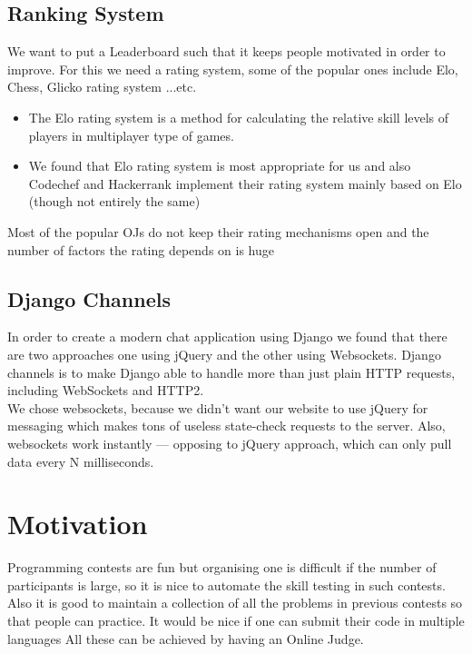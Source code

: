 \documentclass[hidelinks, a4paper,12pt, titlepage]{article}
\begin{document}
\subsection{Ranking System}
We want to put a Leaderboard such that it keeps people motivated in order to improve. For this we need a rating system, some of the popular ones include Elo, Chess, Glicko rating system ...etc.
\begin{itemize}
\item The Elo rating system is a method for calculating the relative skill levels of players in multiplayer type of games. 
\item We found that Elo rating system is most appropriate for us and also Codechef and Hackerrank implement their rating system mainly based on Elo (though not entirely the same)
\end{itemize}
Most of the popular OJs do not keep their rating mechanisms open and the number of factors the rating depends on is huge

\subsection{Django Channels}
In order to create a modern chat application using Django we found that there are two approaches one using jQuery and the other using Websockets. Django channels is to make Django able to handle more than just plain HTTP requests, including WebSockets and HTTP2.\hfill\cite{message}\\

We chose websockets, because we didn’t want our website to use jQuery for messaging which makes tons of useless state-check requests to the server. Also, websockets work instantly — opposing to jQuery approach, which can only pull data every N milliseconds.
\section{Motivation}
Programming contests are fun but organising one is difficult if the number of participants is large, so it is nice to automate the skill testing in such contests. Also it is good to maintain a collection of all the problems in previous contests so that people can practice.
It would be nice if one can submit their code in multiple languages All these can be achieved by having an Online Judge.
\end{document}
